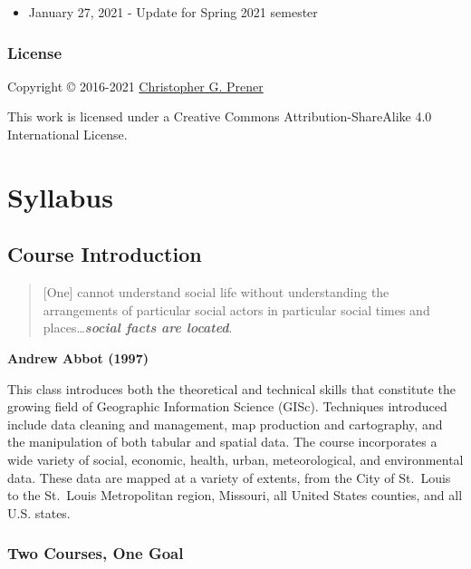 \documentclass[
]{book}
\providecommand{\tightlist}{%
  \setlength{\itemsep}{0pt}\setlength{\parskip}{0pt}}
\begin{document}
\begin{itemize}
\tightlist
\item
  January 27, 2021 - Update for Spring 2021 semester
\end{itemize}

\hypertarget{license}{%
\section*{License}\label{license}}

Copyright © 2016-2021 \href{https://chris-prener.github.io}{Christopher G. Prener}

This work is licensed under a Creative Commons Attribution-ShareAlike 4.0 International License.

\hypertarget{part-syllabus}{%
\part{Syllabus}\label{part-syllabus}}

\hypertarget{course-introduction}{%
\chapter{Course Introduction}\label{course-introduction}}

\begin{quote}
{[}One{]} cannot understand social life without understanding the arrangements of particular social actors in particular social times and places\ldots{}\textbf{\emph{social facts are located}}.
\end{quote}

\textbf{Andrew Abbot (1997)}

This class introduces both the theoretical and technical skills that constitute the growing field of Geographic Information Science (GISc). Techniques introduced include data cleaning and management, map production and cartography, and the manipulation of both tabular and spatial data. The course incorporates a wide variety of social, economic, health, urban, meteorological, and environmental data. These data are mapped at a variety of extents, from the City of St.~Louis to the St.~Louis Metropolitan region, Missouri, all United States counties, and all U.S. states.

\hypertarget{two-courses-one-goal}{%
\section{Two Courses, One Goal}\label{two-courses-one-goal}}
\end{document}
